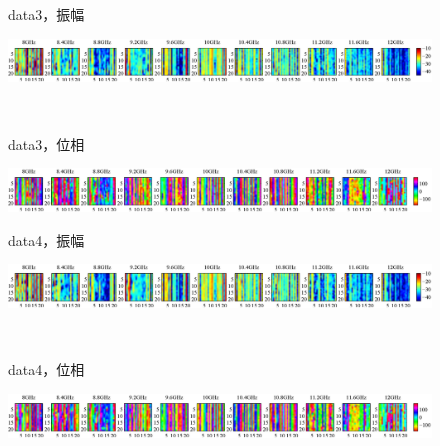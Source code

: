 ﻿\documentclass[12pt,oneside]{jsbook}
\begin{document}
\begin{figure}[bhtp]
 \begin{center}
     \begin{minipage}[c]{0.19\hsize}
      data3，振幅
  \end{minipage}
     \begin{minipage}[c]{0.79\hsize}
\includegraphics[width = \hsize ]{20150204_mine3_raw_a.eps}
  \end{minipage}
\\
     \begin{minipage}[c]{0.19\hsize}
data3，位相
  \end{minipage}
     \begin{minipage}[c]{0.8\hsize}
\includegraphics[width =\hsize ]{20150204_mine3_raw_p.eps}
  \end{minipage}
\end{center}
\end{figure}
\begin{figure}[bhtp]
 \begin{center}
     \begin{minipage}[c]{0.19\hsize}
      data4，振幅
  \end{minipage}
     \begin{minipage}[c]{0.79\hsize}
\includegraphics[width = \hsize ]{20150204_mine4_raw_a.eps}
  \end{minipage}
\\
     \begin{minipage}[c]{0.19\hsize}
data4，位相
  \end{minipage}
     \begin{minipage}[c]{0.8\hsize}
\includegraphics[width =\hsize ]{20150204_mine4_raw_p.eps}
  \end{minipage}
\end{center}
\end{figure}
\end{document}

